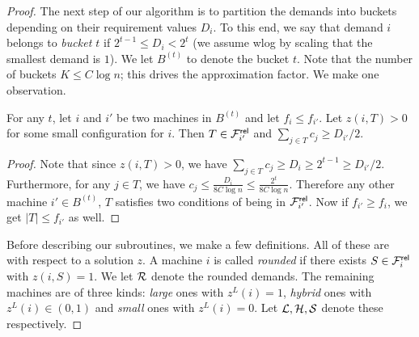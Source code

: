 \documentclass{article}[11pt]
\newcommand{\barcalS}{\bar{\cal S}\xspace}
\newcommand{\bc}{{\bar c}}
\newcommand{\brt}{{(t)}}
\begin{document}
\begin{proof}
	The next step of our algorithm is to partition the demands into buckets depending on their requirement values $D_i$. To this end, we say that demand $i$ belongs to \emph{bucket $t$} if
	$2^{t-1} \leq D_i < 2^t$  (we assume wlog by scaling that  the smallest demand is $1$). We let $B^\brt$ to denote the bucket $t$. 
		Note that the number of buckets $K \leq C\log n$; this drives the approximation factor.
We make one observation. 
\begin{claim}\label{clm:c001}
	For any $t$, let $i$ and $i'$ be two machines in $B^\brt$ and let $f_i \leq f_{i'}$. 
	Let $z(i,T) > 0$ for some small configuration for $i$.
Then $T\in {\cal F}^{\mathsf{rel}}_{i'}$ and $\sum_{j\in T} c_j \geq D_{i'}/2$.
\end{claim}
\begin{proof}
Note that since $z(i,T) > 0$, we have $\sum_{j\in T} c_j \geq D_{i} \geq 2^{t-1} \ge D_{i'}/2$. Furthermore, for any $j\in T$, we have $c_j \leq \frac{D_{i}}{8C\log n} \le \frac{2^t}{8C\log n}$.
Therefore any other machine $i'\in B^\brt$, $T$ satisfies two conditions of being in ${\cal F}^{\mathsf{rel}}_{i'}$.
Now if $f_{i'} \geq f_i$, we get $|T| \leq f_{i'}$ as well. 
\end{proof}
Before describing our subroutines, we make a few definitions. All of these are with respect to a solution $z$. 
A machine $i$ is called {\em rounded} if there exists $S\in {\cal F}^{\mathsf{rel}}_i$ with $z(i,S) = 1$. We let ${\cal R}$ denote the rounded demands.
The remaining machines are of three kinds:  {\em large} ones with $z^L(i) = 1$, {\em hybrid} ones with $z^L(i) \in (0,1)$ and {\em small} ones with $z^L(i) = 0$. 
Let ${\cal L},{\cal H},{\cal S}$ denote these respectively. 


	

\end{proof}
\end{document}

